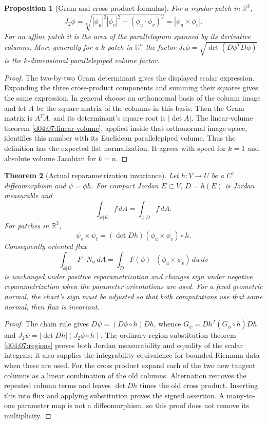 \documentclass[11pt,oneside,openany]{book}
\newtheorem{theorem}{Theorem}[chapter]
\newtheorem{proposition}[theorem]{Proposition}
\theoremstyle{definition}
\theoremstyle{remark}
\newcommand{\R}{\mathbb R}
\newcommand{\family}[1]{}
\begin{document}
\begin{proposition}[Gram and cross-product formulas]\label{d04:10:gram}
For a regular patch in $\R^3$,
\[
 J_2\phi=\sqrt{|\phi_u|^2|\phi_v|^2-(\phi_u\cdot\phi_v)^2}
          =|\phi_u\times\phi_v|.
\]
For an affine patch it is the area of the parallelogram spanned by its
derivative columns. More generally for a $k$-patch in $\R^n$ the factor
$J_k\phi=\sqrt{\det(D\phi^TD\phi)}$ is the $k$-dimensional
parallelepiped volume factor.
\end{proposition}
\begin{proof}
The two-by-two Gram determinant gives the displayed scalar expression.
Expanding the three cross-product components and summing their squares
gives the same expression. In general choose an orthonormal basis of the
column image and let $A$ be the square matrix of the columns in this basis.
Then the Gram matrix is $A^TA$, and its determinant's square root is
$|\det A|$. The linear-volume theorem \cref{d04:07:linear-volume}, applied
inside that orthonormal image space, identifies this number with its
Euclidean parallelepiped volume. Thus the definition has the expected flat normalization.
It agrees with speed for $k=1$ and absolute volume Jacobian for $k=n$.
\end{proof}

\family{K04.10.04}\family{K04.10.05}\family{K04.10.06}
\begin{theorem}[Actual reparametrization invariance]\label{d04:10:reparametrize}
Let $h:V\to U$ be a $C^1$ diffeomorphism and $\psi=\phi h$.
For compact Jordan $E\subset V$, $D=h(E)$ is Jordan measurable and
\[
 \int_{\psi|E}f\,dA=\int_{\phi|D}f\,dA.
\]
For patches in $\R^3$,
\[
 \psi_s\times\psi_t=(\det Dh)(\phi_u\times\phi_v)\circ h.
\]
Consequently oriented flux
\[
 \int_{\phi|D}F\cdot N_\phi\,dA
 =\int_D F(\phi)\cdot(\phi_u\times\phi_v)\,du\,dv
\]
is unchanged under positive reparametrization and changes sign under
negative reparametrization when the parameter orientations are used.
For a fixed geometric normal, the chart's sign must be adjusted so that
both computations use that same normal; then flux is invariant.
\end{theorem}
\begin{proof}
The chain rule gives $D\psi=(D\phi\circ h)Dh$, whence
$G_\psi=Dh^T(G_\phi\circ h)Dh$ and
$J_2\psi=|\det Dh|(J_2\phi\circ h)$.
The ordinary region substitution theorem \cref{d04:07:regions} proves both
Jordan measurability and equality of the scalar integrals; it also supplies
the integrability equivalence for bounded Riemann data when these are used.
For the cross product expand each of the two new tangent columns as a
linear combination of the old columns. Alternation removes the repeated
column terms and leaves $\det Dh$ times the old cross product. Inserting
this into flux and applying substitution proves the signed assertion.
A many-to-one parameter map is not a diffeomorphism, so this proof does
not remove its multiplicity.
\end{proof}
\end{document}
